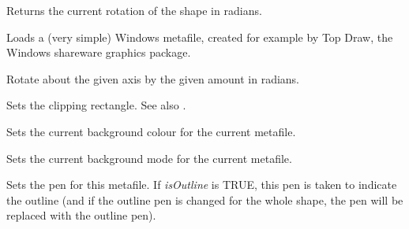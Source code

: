 \label{wxdrawnshapegetrotation}


Returns the current rotation of the shape in radians.



Loads a (very simple) Windows metafile, created for example by Top Draw, the Windows shareware graphics package.



Rotate about the given axis by the given amount in radians.

\label{wxdrawnshapesetclippingrect}


Sets the clipping rectangle. See also .

\label{wxdrawnshapesetdrawnbackgroundcolour}


Sets the current background colour for the current metafile.

\label{wxdrawnshapesetdrawnbackgroundmode}


Sets the current background mode for the current metafile.

\label{wxdrawnshapesetdrawnbrush}


Sets the pen for this metafile. If {\it isOutline} is TRUE, this pen is taken to indicate the outline
(and if the outline pen is changed for the whole shape, the pen will be replaced with the outline pen).

\label{wxdrawnshapesetdrawnfont}

